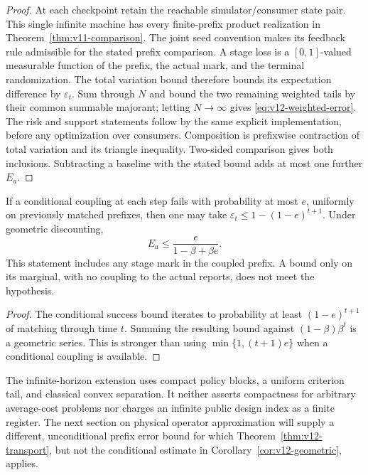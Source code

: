 \begin{proof}
At each checkpoint retain the reachable simulator/consumer state pair.
This single infinite machine has every finite-prefix product realization
in Theorem~\ref{thm:v11-comparison}. The joint seed convention makes its
feedback rule admissible for the stated prefix comparison. A stage loss
is a $[0,1]$-valued measurable function of the prefix, the actual mark,
and the terminal randomization. The total variation bound therefore
bounds its expectation difference by $\varepsilon_t$. Sum through $N$
and bound the two remaining weighted tails by their common summable
majorant; letting $N\to\infty$ gives \eqref{eq:v12-weighted-error}.
The risk and support statements follow by the same explicit
implementation, before any optimization over consumers. Composition is
prefixwise contraction of total variation and its triangle inequality.
Two-sided comparison gives both inclusions. Subtracting a baseline with
the stated bound adds at most one further $E_a$.
\end{proof}

\begin{corollary}
\label{cor:v12-geometric}
If a conditional coupling at each step fails with probability at most
$e$, uniformly on previously matched prefixes, then one may take
$\varepsilon_t\le1-(1-e)^{t+1}$. Under geometric discounting,
\[
 E_a\le \frac{e}{1-\beta+\beta e}.
\]
This statement includes any stage mark in the coupled prefix. A bound
only on its marginal, with no coupling to the actual reports, does not
meet the hypothesis.
\end{corollary}

\begin{proof}
The conditional success bound iterates to probability at least
$(1-e)^{t+1}$ of matching through time $t$. Summing the resulting bound
against $(1-\beta)\beta^t$ is a geometric series. This is stronger than
using $\min\{1,(t+1)e\}$ when a conditional coupling is available.
\end{proof}

The infinite-horizon extension uses compact policy blocks, a uniform
criterion tail, and classical convex separation. It neither asserts
compactness for arbitrary average-cost problems nor charges an infinite
public design index as a finite register. The next section on physical
operator approximation will supply a different, unconditional prefix
error bound for which Theorem~\ref{thm:v12-transport}, but not the
conditional estimate in Corollary~\ref{cor:v12-geometric}, applies.
